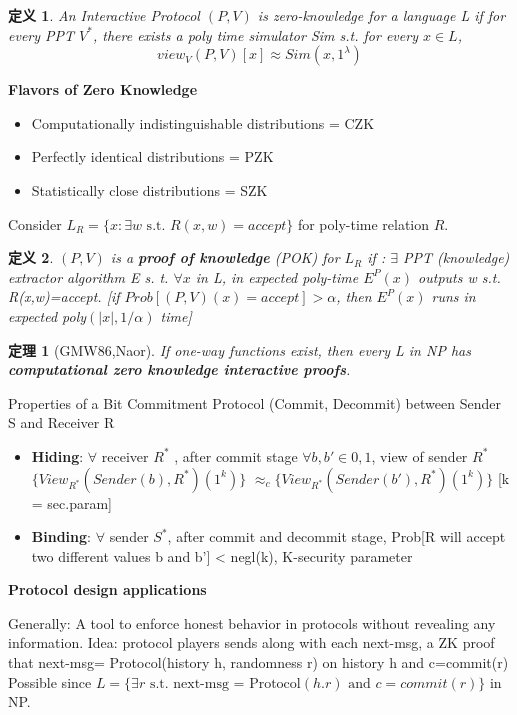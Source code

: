 \documentclass[10pt]{ctexart}
\newtheorem{definition}{定义}
\newtheorem{theorem}{定理}
\begin{document}
\begin{definition}
	An Interactive Protocol $(P,V)$ is zero-knowledge for a language L if for every PPT $V^*$, there exists a poly time simulator Sim s.t. for every $x \in L$,
	$$
	view_V(P,V)[x] \approx Sim(x,1^\lambda)
	$$
\end{definition}

\textbf{Flavors of Zero Knowledge}
\begin{itemize}
	\item Computationally indistinguishable distributions = CZK
	\item Perfectly identical distributions = PZK
	\item Statistically close distributions = SZK
\end{itemize}

Consider $L_R=\{x: \exists w \text{ s.t. }  R(x,w)= accept \}$ for poly-time relation $R$.
\begin{definition}
	$(P,V)$ is a \textbf{proof of knowledge} (POK) for $L_R$ if :
	$\exists$ PPT (knowledge) extractor algorithm E s. t. $\forall x$ in L,
	in expected poly-time $E^P(x)$ outputs w s.t. R(x,w)=accept. {\color{blue}[if $Prob[(P,V)(x)=accept] > \alpha$, then $E^P(x)$ runs in expected poly$(|x|,1/ \alpha)$ time]}
\end{definition}

\begin{theorem}[GMW86,Naor]
	If one-way functions exist, then every L in NP has \textbf{computational zero knowledge interactive proofs}.
\end{theorem}

Properties of a Bit Commitment Protocol (Commit, Decommit) between Sender S and Receiver R
\begin{itemize}
	\item \textbf{Hiding}: $\forall$ receiver $R^*$ , after {\color{blue} commit} stage $\forall b, b' \in {0,1}$, view of sender $R^*$ $\{ View_{R^*}(Sender(b),R^*)(1^k)\}$ $ \approx_c  \{ View_{R^*}(Sender(b'),R^*)(1^k)\}$ [k = sec.param]
	\item \textbf{Binding}: $\forall$ sender $S^*$, after {\color{blue} commit} and {\color{blue} decommit stage}, Prob[R will accept two different values b and b’] < negl(k), K-security parameter
\end{itemize}

\textbf{Protocol design applications}

Generally: A tool to enforce honest behavior {\color{violet}in protocols} without revealing any information. Idea: protocol players sends along with each next-msg, a ZK proof that next-msg= Protocol(history h, randomness r) on history h and c=commit(r) Possible since {\color{violet}$L=\{\exists r \text{ s.t. next-msg = Protocol}(h.r) \text{ and } c = commit(r)\}$} in NP.
\end{document}
